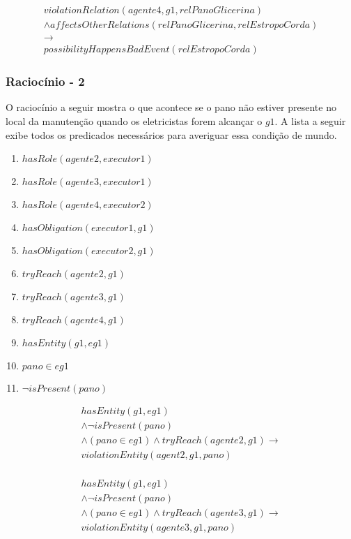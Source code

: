 \begin{eqnarray}\nonumber
	violationRelation(agente4,g1,relPanoGlicerina)  \nonumber \\ 
	\wedge affectsOtherRelations(relPanoGlicerina,relEstropoCorda)   \nonumber \\ 
	\to \nonumber \\  
	possibilityHappensBadEvent(relEstropoCorda) 
\end{eqnarray}



\subsubsection{Raciocínio - 2} 
\label{raciocinio2}
O raciocínio a seguir mostra o que acontece se o pano não estiver presente no local da manutenção quando os eletricistas forem alcançar o $g1$. A lista a seguir exibe todos os predicados necessários para averiguar essa condição de mundo. 


\begin{enumerate}
	\item $hasRole(agente2,executor1)$ 
	\item $hasRole(agente3,executor1)$	 	
	\item $hasRole(agente4,executor2)$	 
	\item $hasObligation(executor1,g1)$
	\item $hasObligation(executor2,g1)$
	\item $tryReach(agente2,g1)$ 
	\item $tryReach(agente3,g1)$	 	
	\item $tryReach(agente4,g1)$	
	\item $hasEntity(g1,eg1)$		
	\item $pano \in eg1$
	\item $\neg isPresent(pano)$
\end{enumerate}

\begin{eqnarray}\nonumber
	hasEntity(g1,eg1) \nonumber \\ 
	\wedge \neg isPresent(pano) 	\nonumber \\ 
	\wedge (pano \in eg1) \wedge tryReach(agente2,g1) \to \nonumber \\ 
	violationEntity(agent2,g1,pano) \nonumber \\
\end{eqnarray}

\begin{eqnarray}\nonumber
	hasEntity(g1,eg1) \nonumber \\ 
	\wedge \neg isPresent(pano) 	\nonumber \\ 
	\wedge (pano \in eg1) \wedge tryReach(agente3,g1) \to \nonumber \\ 
	violationEntity(agente3,g1,pano) \nonumber \\
\end{eqnarray}


